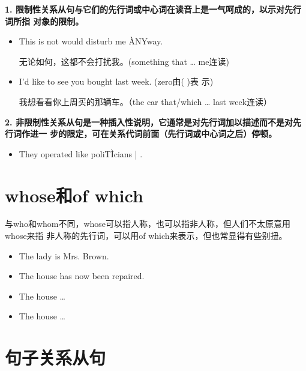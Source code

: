 \textbf{1. 限制性关系从句与它们的先行词或中心词在读音上是一气呵成的，以示对先行词所指
  对象的限制。}
\begin{itemize}
\item This is not   would disturb me \`{A}NYway.

  无论如何，这都不会打扰我。(something that \ldots{} me连读)
\item I'd like to see   you bought last week. (zero由( )表
  示)

  我想看看你上周买的那辆车。（the car that/which \ldots{} last week连读）

\end{itemize}

\textbf{2. 非限制性关系从句是一种插入性说明，它通常是对先行词加以描述而不是对先行词作进一
  步的限定，可在关系代词前面（先行词或中心词之后）停顿。}
\begin{itemize}
\item  They operated like poliT\`{I}cians | .
\end{itemize}

\section{whose和of which}

与who和whom不同，whose可以指人称，也可以指非人称，但人们不太原意用whose来指
非人称的先行词，可以用of which来表示，但也常显得有些别扭。
\begin{itemize}
\item The lady  is Mrs. Brown.
\item The house  has now been repaired.
\item The house  \ldots{}
\item The house   \ldots{}
\end{itemize}

\section{句子关系从句}

